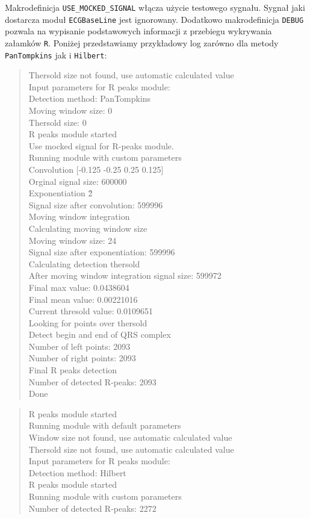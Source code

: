\documentclass[a4paper, 11pt]{article}
\begin{document}
\indent Makrodefinicja \verb|USE_MOCKED_SIGNAL| włącza użycie testowego sygnału. Sygnał jaki dostarcza moduł \verb|ECGBaseLine| jest ignorowany. Dodatkowo makrodefinicja \verb|DEBUG| pozwala na wypisanie podstawowych informacji z przebiegu wykrywania załamków \verb|R|. Poniżej przedstawiamy przykładowy log zarówno dla metody \verb|PanTompkins| jak i \verb|Hilbert|:
\begin{verse}
Thersold size not found, use automatic calculated value\\ 
Input parameters for R peaks module:\\
Detection method: PanTompkins\\ 
Moving window size: 0\\ 
Thersold size: 0 \\
R peaks module started \\
Use mocked signal for R-peaks module. \\
Running module with custom parameters \\
Convolution [-0.125 -0.25 0.25 0.125] \\
Orginal signal size: 600000 \\
Exponentiation \^2 \\
Signal size after convolution: 599996 \\
Moving window integration\\
Calculating moving window size\\
Moving window size: 24 \\
Signal size after exponentiation: 599996 \\
Calculating detection thersold \\
After moving window integration signal size: 599972 \\
Final max value: 0.0438604 \\
Final mean value: 0.00221016\\
Current thresold value: 0.0109651 \\
Looking for points over thersold \\
Detect begin and end of QRS complex \\
Number of left points: 2093 \\
Number of right points: 2093 \\
Final R peaks detection \\
Number of detected R-peaks: 2093 \\
Done
\end{verse}

\begin{verse}
R peaks module started \\
Running module with default parameters \\
Window size not found, use automatic calculated value \\
Thersold size not found, use automatic calculated value \\
Input parameters for R peaks module:\\
Detection method: Hilbert \\
R peaks module started \\
Running module with custom parameters \\
Number of detected R-peaks: 2272 
\end{verse}
\end{document}
